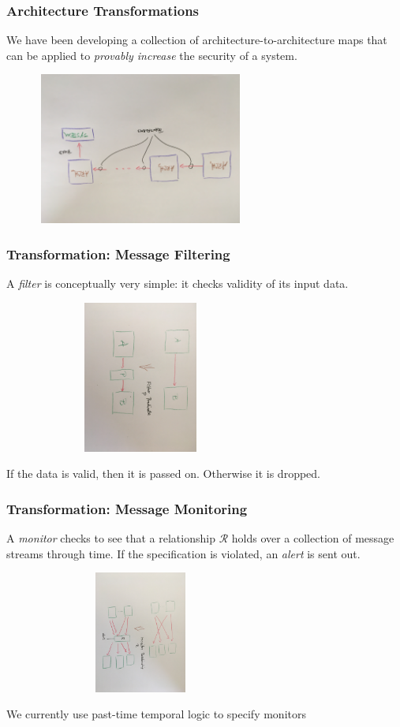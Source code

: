 \documentclass{beamer}
\begin{document}
\begin{frame}\frametitle{Architecture Transformations}

We have been developing a collection of architecture-to-architecture maps that can be applied to
\emph{provably increase} the security of a system.

\vspace*{4mm}

\includegraphics[width=90mm,height=50mm]{arch-trans.jpg}
\end{frame}

\begin{frame}\frametitle{Transformation: Message Filtering}

A \emph{filter} is conceptually very simple: it checks validity of its input data.

\hspace*{10mm}\includegraphics[width=90mm,height=50mm]{filter.jpg}

If the data is valid, then it is passed on. Otherwise it is dropped.

\end{frame}


\begin{frame}\frametitle{Transformation: Message Monitoring}

A \emph{monitor} checks to see that a relationship $\mathcal{R}$ holds
over a collection of message streams through time. If the
specification is violated, an \emph{alert} is sent out.

\hspace*{10mm}\includegraphics[width=90mm,height=40mm]{monitor.jpg}

We currently use past-time temporal logic to specify monitors

\end{frame}
\end{document}
